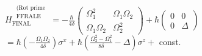 $H_{\text {FINAL }}^{\substack{\text { (Rot prime } \\ \text { FFRALE }}}=-\frac{\hbar}{4 \delta}\left(\begin{array}{cc}\Omega_{1}^{2} & \Omega_{1} \Omega_{2} \\ \Omega_{1} \Omega_{2} & \Omega_{2}^{2}\end{array}\right)+\hbar\left(\begin{array}{cc}0 & 0 \\ 0 & \Delta\end{array}\right)$\\
$=\hbar\left(-\frac{\Omega_{1} \Omega_{2}}{4 \delta}\right) \sigma^{x}+\hbar\left(\frac{\Omega_{2}^{2}-\Omega_{1}^{2}}{8 \delta}-\Delta\right) \sigma^{z}+$ const.
